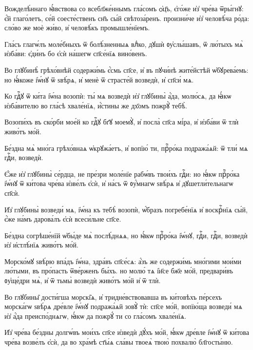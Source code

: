 \hKv Вожделѣ́ннаго ꙗ҆́вствова со всебл҃же́ннымъ гла́сомъ  ѻ҆ц҃ъ, є҆го́же и҆з̾ чре́ва ѿры́гнꙋ: є҆́й глаго́летъ,  се́й соесте́ственъ сн҃ъ сы́й свѣтоза́ренъ. произни́че и҆з̾  человѣ́ча ро́да: сло́во же моѐ жи́во, и҆ человѣ́къ  промышле́нїемъ.  
%

\hKv Гла́съ глагѡ́лъ моле́бныхъ ѿ болѣ́зненныѧ влⷣко, дꙋшѝ  ᲂу҆слы́шавъ, ѿ лю́тыхъ мѧ̀ и҆зба́ви: є҆ди́нъ бо є҆сѝ  на́шегѡ сп҃се́нїѧ вино́венъ. 
%

\hKv Во глꙋбинѣ̀ грѣхо́внѣй содержи́мь є҆́смь сп҃се, и҆ въ  пꙋчи́нѣ жите́йстѣй ѡ҆бꙋрева́емь: но ꙗ҆́коже і҆ѡ́нꙋ ѿ  ѕвѣ́рѧ, и҆ менѐ ѿ страсте́й возведѝ, и҆ сп҃си́ мѧ. 
%

\hKv Ко гдⷭ҇ꙋ ѿ ки́та і҆ѡ́на возопѝ: ты́  мѧ возведѝ и҆з̾ глꙋбины̀ а҆́да, молю́сѧ, да ꙗ҆́кѡ  и҆зба́вителю во гла́сѣ хвале́нїѧ, и҆́стины же дх҃омъ пожрꙋ̀  тебѣ̀. 

\hKv Возопи́хъ въ ско́рби мое́й ко гдⷭ҇ꙋ бг҃ꙋ моемꙋ̀, и҆ посла̀  сп҃са мі́ра, и҆ и҆зба́ви ѿ тлѝ живо́тъ мо́й. 

\hKv Бе́здна мѧ̀ мно́га грѣхо́внаѧ ѡ҆крꙋжа́етъ, и҆ вопїю́ ти,  прⷪ҇ро́ка подража́ѧй: ѿ тли́ мѧ гдⷭ҇и, возведѝ. 

\hKv Є҆́же и҆з̾ глꙋбины̀ се́рдца, не пре́зри моле́нїе рабѡ́въ  твои́хъ гдⷭ҇и: но ꙗ҆́кѡ прⷪ҇ро́ка і҆ѡ́нꙋ ѿ  ки́това чре́ва и҆зве́лъ є҆сѝ, и҆ на́съ  ѿ ᲂу҆́мнагѡ ѕвѣ́рѧ и҆ дꙋшетли́тельнагѡ сп҃сѝ. 

\hKv И҆з̾ глꙋбины̀ возведи́ мѧ, і҆ѡ́на къ тебѣ̀ возопѝ,  ѡ҆́бразъ погребе́нїѧ и҆ воскрⷭ҇нїѧ сы́й, є҆́же на́мъ  дарова́лъ є҆сѝ всеси́льне сп҃се. 

\hKv Бе́здна согрѣше́нїй ѡ҆бы́де мѧ̀ послѣ́днѧѧ, но ꙗ҆́кѡ  прⷪ҇ро́ка і҆ѡ́нꙋ, гдⷭ҇и, гдⷭ҇и, возведѝ и҆з̾ и҆стлѣ́нїѧ  живо́тъ мо́й. 

\hKv Морско́мꙋ ѕвѣ́рю впа́дъ і҆ѡ́на, здра́въ сп҃се́сѧ: а҆́зъ же  содержи́мь мно́гими мои́ми лю́тыми, въ про́пасть ѿве́рженъ  бы́хъ. но молю́ тѧ і҆и҃се бж҃е мо́й, предвари́въ ᲂу҆ще́дри  мѧ̀, и҆ ѿ тьмы̀ возведѝ живо́тъ мо́й и҆ ѿ тлѝ.  

\hKv Во глꙋбины̑ дости́гша морскі̑ѧ, и҆ тридне́вствовавша въ  ки́товѣхъ пе́рсехъ морска́гѡ ѕвѣ́рѧ дре́вле і҆ѡ́нꙋ  подража́ѧй зовꙋ̀ тѝ: сп҃се мо́й, вопїю́ща возведи́ мѧ и҆з̾  а҆́да преиспо́днѧгѡ, ꙗ҆́кѡ да пожрꙋ́ ти со гла́сомъ  хвале́нїѧ.  

\hKv И҆з̾ чре́ва бе́здны долгѡ́въ мои́хъ сп҃се и҆зведѝ дꙋ́хъ  мо́й, ꙗ҆́кѡ дре́вле і҆ѡ́нꙋ ѿ ки́това чре́ва возве́лъ  є҆сѝ, да во хра́мѣ ст҃ы́ѧ сла́вы твоеѧ̀ твою̀ похвалю̀  бл҃госты́ню. 

